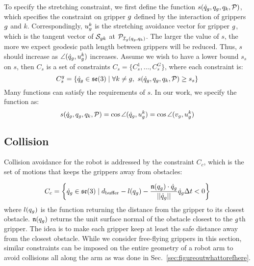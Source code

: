 To specify the stretching constraint, we first define the function $s(\dot{q}_g, q_g, q_k, \mathcal{P})$, which specifies the constraint on gripper $g$ defined by the interaction of grippers $g$ and $k$. Correspondingly, $u_g^k$ is the stretching avoidance vector for gripper $g$, which is the tangent vector of $\mathcal{S}_{g k}$ at $\mathcal{P}_{\mathcal{I}_g(q_g, q_k)}$. The larger the value of $s$, the more we expect geodesic path length between grippers will be reduced. Thus, $s$ should increase as $\angle (\dot{q}_g, u_g^k)$ increases. Assume we wish to have a lower bound $s_s$ on $s$, then $C_s$ is a set of constraints $C_s = \{C_s^1, \dots, C_s^G\}$, where each constraint is:
\begin{equation}
    C_s^g =\{ \dot{q}_g\in \mathfrak{se}(3) \mid \forall k\neq g, \ s(\dot{q}_g, q_g, q_k, \mathcal{P}) \geq s_s  \}
    \label{Eq:Stretching_avoidance_Method}
\end{equation}
Many functions can satisfy the requirements of $s$. In our work, we specify the function as:
\begin{equation}
    s(\dot{q}_g, q_g, q_k, \mathcal{P}) = \cos \angle (\dot{q}_g, u_g^k ) = \cos \angle (v_g, u_g^k )
    \label{Eq:Stretching_avoidance_Method_This_Paper}
\end{equation}

\subsection{Collision} Collision avoidance for the robot is addressed by the constraint $C_c$, which is the set of motions that keeps the grippers away from obstacles:


\begin{equation}
    C_c = \left\{\dot{q}_g\in \mathfrak{se}(3) \mid  d_\textrm{buffer} - l(q_g) - \frac{\mathfrak{n}(q_g) \cdot \dot{q}_g}{||\dot{q}_g||} \dot{q}_g \Delta t < 0\right\}
    \label{Eq:Collision_constraint_Method}
\end{equation}
where $l(q_g)$ is the function returning the distance from the gripper to its closest obstacle. $\mathfrak{n}(q_g)$ returns the unit surface normal of the obstacle closest to the $g$th gripper. The idea is to make each gripper keep at least the safe distance away from the closest obstacle. While we consider free-flying grippers in this section, similar constraints can be imposed on the entire geometry of a robot arm to avoid collisions all along the arm as was done in Sec.~\ref{sec:figureoutwhattorefhere}.


